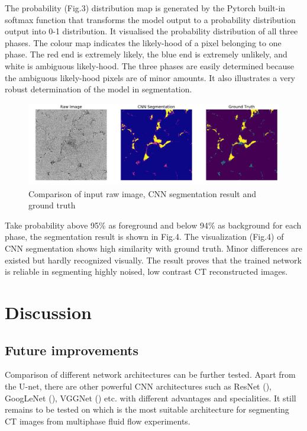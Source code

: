 \documentclass[draft,linenumbers]{agujournal2018}
\begin{document}
The probability (Fig.3) distribution map is generated by the Pytorch built-in softmax function that transforms the model output to a probability distribution output into 0-1 distribution. It visualised the probability distribution of all three phases. The colour map indicates the likely-hood of a pixel belonging to one phase. The red end is extremely likely, the blue end is extremely unlikely, and white is ambiguous likely-hood. The three phases are easily determined because the ambiguous likely-hood pixels are of minor amounts. It also illustrates a very robust determination of the model in segmentation. 

\begin{figure}[h]
 \centering
 \includegraphics[width=33pc]{imgs/17_test_result.png}
 \caption{Comparison of input raw image, CNN segmentation result and ground truth}
 \label{fig4}
 \end{figure}

Take probability above 95\% as foreground and below 94\% as background for each phase, the segmentation result is shown in Fig.4. The visualization (Fig.4) of CNN segmentation shows high similarity with ground truth. Minor differences are existed but hardly recognized visually. The result proves that the trained network is reliable in segmenting highly noised, low contrast CT reconstructed images.

\section{Discussion}
\subsection{Future improvements}
Comparison of different network architectures can be further tested. Apart from the U-net, there are other powerful CNN architectures such as ResNet (\citet{he2016deep}), GoogLeNet (\citet{szegedy2015going}), VGGNet (\citet{simonyan2014very}) etc. with different advantages and specialities. It still remains to be tested on which is the most suitable architecture for segmenting \textmu CT images from multiphase fluid flow experiments.
\end{document}
